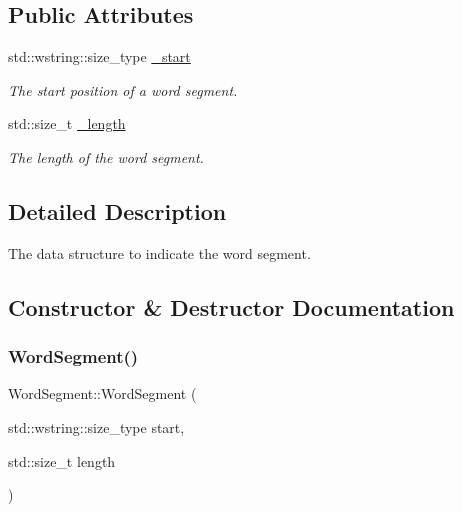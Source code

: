 \subsection*{Public Attributes}
\begin{DoxyCompactItemize}
\item 
\mbox{\label{structlakoo_1_1_word_segment_aa34d092bcaa7f6b618f98096e751fa17}} 
std\+::wstring\+::size\+\_\+type \hyperlink{structlakoo_1_1_word_segment_aa34d092bcaa7f6b618f98096e751fa17}{\+\_\+start}
\begin{DoxyCompactList}\small\item\em The start position of a word segment. \end{DoxyCompactList}\item 
\mbox{\label{structlakoo_1_1_word_segment_addd020386d93719487e8d86ab2e5f066}} 
std\+::size\+\_\+t \hyperlink{structlakoo_1_1_word_segment_addd020386d93719487e8d86ab2e5f066}{\+\_\+length}
\begin{DoxyCompactList}\small\item\em The length of the word segment. \end{DoxyCompactList}\end{DoxyCompactItemize}


\subsection{Detailed Description}
The data structure to indicate the word segment. 

\subsection{Constructor \& Destructor Documentation}
\mbox{\label{structlakoo_1_1_word_segment_a81c5d053fe3622a51cbae35c3083fda8}} 
\subsubsection{\texorpdfstring{Word\+Segment()}{WordSegment()}}
{\footnotesize\ttfamily Word\+Segment\+::\+Word\+Segment (\begin{DoxyParamCaption}\item[{std\+::wstring\+::size\+\_\+type}]{start,  }\item[{std\+::size\+\_\+t}]{length }\end{DoxyParamCaption})}



